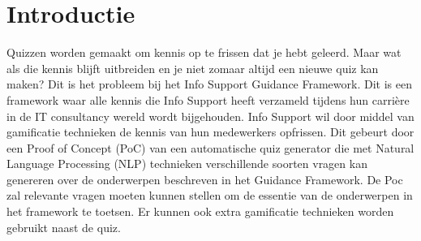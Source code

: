 
\section{Introductie}%
\label{sec:introductie}

Quizzen worden gemaakt om kennis op te frissen dat je hebt geleerd. Maar wat als die kennis blijft uitbreiden en je niet zomaar altijd een nieuwe quiz kan maken? Dit is het probleem bij het Info Support Guidance Framework. Dit is een framework waar alle kennis die Info Support heeft verzameld tijdens hun carrière in de IT consultancy wereld wordt bijgehouden. Info Support wil door middel van gamificatie technieken de kennis van hun medewerkers opfrissen. Dit gebeurt door een Proof of Concept (PoC) van een automatische quiz generator die met Natural Language Processing (NLP) technieken verschillende soorten vragen kan genereren over de onderwerpen beschreven in het Guidance Framework. De Poc zal relevante vragen moeten kunnen stellen om de essentie van de onderwerpen in het framework te toetsen. Er kunnen ook extra gamificatie technieken worden gebruikt naast de quiz.






